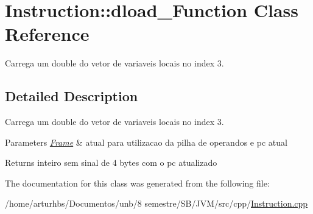 \hypertarget{classInstruction_1_1dload__3Function}{}\section{Instruction\+:\+:dload\+\_\+Function Class Reference}
\label{classInstruction_1_1dload__3Function}


Carrega um double do vetor de variaveis locais no index 3.  




\subsection{Detailed Description}
Carrega um double do vetor de variaveis locais no index 3. 


\begin{DoxyParams}{Parameters}
{\em \hyperlink{classFrame}{Frame}} & atual para utilizacao da pilha de operandos e pc atual \\
\hline
\end{DoxyParams}
\begin{DoxyReturn}{Returns}
inteiro sem sinal de 4 bytes com o pc atualizado 
\end{DoxyReturn}


The documentation for this class was generated from the following file\+:\begin{DoxyCompactItemize}
\item 
/home/arturhbs/\+Documentos/unb/8 semestre/\+S\+B/\+J\+V\+M/src/cpp/\hyperlink{Instruction_8cpp}{Instruction.\+cpp}\end{DoxyCompactItemize}
